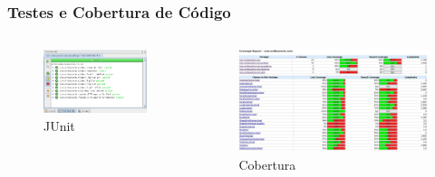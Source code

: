 \frame
{
\frametitle{Testes e Cobertura de Código}
\begin{columns}[c]
\column{1.5in}
	\begin{figure}
		\includegraphics[width=\textwidth]{./imgs/testes.png}
		\caption{JUnit}
	\end{figure}
\column{1.5in}
	\begin{figure}
		\includegraphics[width=\textwidth]{./imgs/cobertura.png}
		\caption{Cobertura}
	\end{figure}
\end{columns}
}
